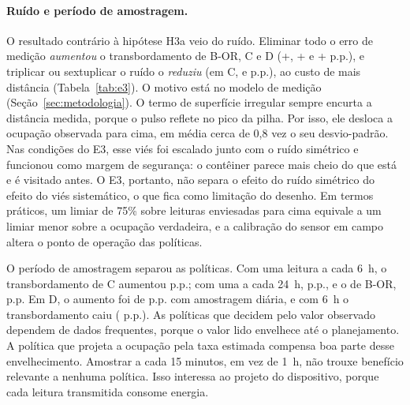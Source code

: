\paragraph{Ruído e período de amostragem.}
O resultado contrário à hipótese H3a veio do ruído. Eliminar todo o erro de
medição \emph{aumentou} o transbordamento de B-OR, C e D
(+\DifETdegradacaoRuidoZBORvsBOROv, +\DifETdegradacaoRuidoZCvsCOv{} e
+\DifETdegradacaoRuidoZDvsDOv{} p.p.), e triplicar ou sextuplicar o ruído o
\emph{reduziu} (em C, \DifETdegradacaoRuidoTXCvsCOv{} e
\DifETdegradacaoRuidoSXCvsCOv{} p.p.), ao custo de mais distância
(Tabela~\ref{tab:e3}). O motivo está no modelo de medição
(Seção~\ref{sec:metodologia}). O termo de superfície irregular sempre encurta
a distância medida, porque o pulso reflete no pico da pilha. Por isso, ele
desloca a ocupação observada para cima, em média cerca de 0,8 vez o seu
desvio-padrão. Nas condições do E3, esse viés foi escalado junto com o ruído
simétrico e funcionou como margem de segurança: o contêiner parece mais cheio
do que está e é visitado antes. O E3, portanto, não separa o efeito do ruído
simétrico do efeito do viés sistemático, o que fica como limitação do
desenho. Em termos práticos, um limiar de 75\% sobre leituras enviesadas
para cima equivale a um limiar menor sobre a ocupação verdadeira, e a
calibração do sensor em campo altera o ponto de operação das políticas.

O período de amostragem separou as políticas. Com uma leitura a cada 6~h, o
transbordamento de C aumentou \DifETdegradacaoAmostraSHCvsCOv{} p.p.; com uma
a cada 24~h, \DifETdegradacaoAmostraDQHCvsCOv{} p.p., e o de B-OR,
\DifETdegradacaoAmostraDQHBORvsBOROv{} p.p. Em D, o aumento foi de
\DifETdegradacaoAmostraDQHDvsDOv{} p.p. com amostragem diária, e com 6~h o
transbordamento caiu (\DifETdegradacaoAmostraSHDvsDOv{} p.p.). As políticas
que decidem pelo valor observado dependem de dados frequentes, porque o valor
lido envelhece até o planejamento. A política que projeta a ocupação pela
taxa estimada compensa boa parte desse envelhecimento. Amostrar a cada 15
minutos, em vez de 1~h, não trouxe benefício relevante a nenhuma política.
Isso interessa ao projeto do dispositivo, porque cada leitura transmitida
consome energia.

\begin{table}[ht]
\centering
\caption{E3 -- variação do transbordamento em relação à base, dentro de cada política (p.p. do volume gerado; 30 pares; Holm na família E3/transbordamento).}
\label{tab:e3deg}
\scriptsize
\resizebox{\textwidth}{!}{}
\end{table}

